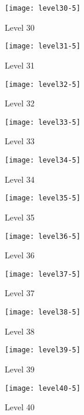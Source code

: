 \begin{figure}
  \centering
  \texttt{[image: level30-5]}
  \caption{Level 30}
  \label{fig:level30-stats}
\end{figure}

\clearpage

\begin{figure}
  \centering
  \texttt{[image: level31-5]}
  \caption{Level 31}
  \label{fig:level31-stats}
\end{figure}
 
\begin{figure}
  \centering
  \texttt{[image: level32-5]}
  \caption{Level 32}
  \label{fig:level32-stats}
\end{figure}

\begin{figure}
  \centering
  \texttt{[image: level33-5]}
  \caption{Level 33}
  \label{fig:level33-stats}
\end{figure}
 
\begin{figure}
  \centering
  \texttt{[image: level34-5]}
  \caption{Level 34}
  \label{fig:level34-stats}
\end{figure}

\begin{figure}
  \centering
  \texttt{[image: level35-5]}
  \caption{Level 35}
  \label{fig:level35-stats}
\end{figure}
 
\begin{figure}
  \centering
  \texttt{[image: level36-5]}
  \caption{Level 36}
  \label{fig:level36-stats}
\end{figure}

\begin{figure}
  \centering
  \texttt{[image: level37-5]}
  \caption{Level 37}
  \label{fig:level37-stats}
\end{figure}
 
\begin{figure}
  \centering
  \texttt{[image: level38-5]}
  \caption{Level 38}
  \label{fig:level38-stats}
\end{figure}

\begin{figure}
  \centering
  \texttt{[image: level39-5]}
  \caption{Level 39}
  \label{fig:level39-stats}
\end{figure}
 
\begin{figure}
  \centering
  \texttt{[image: level40-5]}
  \caption{Level 40}
  \label{fig:level40-stats}
\end{figure}

\clearpage
